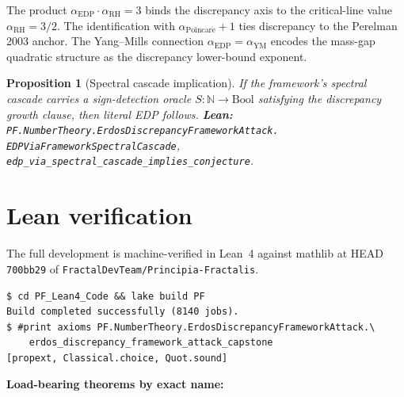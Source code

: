 \documentclass[11pt,a4paper]{article}
\theoremstyle{plain}
\newtheorem{proposition}[theorem]{Proposition}
\theoremstyle{definition}
\begin{document}
The product $\alpha_{\mathrm{EDP}} \cdot \alpha_{\mathrm{RH}} = 3$ binds
the discrepancy axis to the critical-line value
$\alpha_{\mathrm{RH}} = 3/2$. The identification with
$\alpha_{\mathrm{Poincar\acute e}} + 1$ ties discrepancy to the
Perelman 2003 anchor. The Yang--Mills connection
$\alpha_{\mathrm{EDP}} = \alpha_{\mathrm{YM}}$ encodes the mass-gap
quadratic structure as the discrepancy lower-bound exponent.

\begin{proposition}[Spectral cascade implication]
\label{prop:cascade}
If the framework's spectral cascade carries a sign-detection oracle
$S : \mathbb{N} \to \mathrm{Bool}$ satisfying the discrepancy growth
clause, then literal EDP follows.
\textbf{Lean:}
\texttt{PF.NumberTheory.ErdosDiscrepancyFrameworkAttack.\\
EDPViaFrameworkSpectralCascade},
\texttt{edp\_via\_spectral\_cascade\_implies\_conjecture}.
\end{proposition}

\section{Lean verification}
\label{sec:lean}

The full development is machine-verified in Lean~4 against mathlib at
HEAD \texttt{700bb29} of \texttt{FractalDevTeam/Principia-Fractalis}.

\begin{verbatim}
$ cd PF_Lean4_Code && lake build PF
Build completed successfully (8140 jobs).
$ #print axioms PF.NumberTheory.ErdosDiscrepancyFrameworkAttack.\
    erdos_discrepancy_framework_attack_capstone
[propext, Classical.choice, Quot.sound]
\end{verbatim}

\noindent\textbf{Load-bearing theorems by exact name:}
\end{document}
